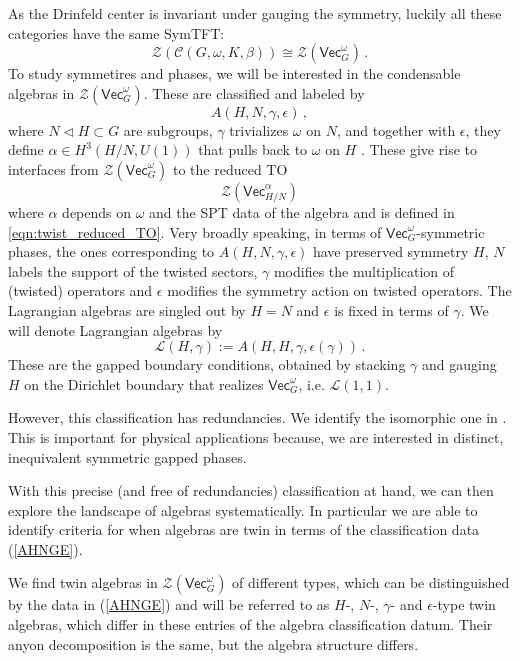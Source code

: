 \documentclass[aps,twocolumn,prx,floatfix,preprintnumbers, nofootinbib,10pt]{revtex4-2}
\numberwithin{equation}{section}
\theoremstyle{definition}
\newcommand{\be}{\begin{equation}}
\newcommand{\ee}{\end{equation}}
\newcommand{\cC}{\mathcal{C}}
\newcommand{\cL}{\mathcal{L}}
\newcommand{\cZ}{\mathcal{Z}}
\renewcommand{\Vec}{\mathsf{Vec}}
\newcommand{\eps}{\epsilon}
\begin{document}
As the Drinfeld center is invariant under gauging the symmetry, luckily all these categories have the same SymTFT: 
\be 
\cZ(\cC(G, \omega, K, \beta))\cong \cZ(\Vec_G^\omega) \,.
\ee
To study symmetires and phases, we will be interested in the condensable algebras in $\cZ(\Vec_G^\omega)$. These are classified and labeled by 
\be \label{AHNGE}
A(H, N, \gamma, \eps) \,,
\ee 
where $N\triangleleft H \subset G$ are subgroups, $\gamma$ trivializes $\omega$ on $N$, and together with $\eps$, they define $\alpha\in H^3(H/N, U(1))$ that pulls back to $\omega$ on $H$ \cite{Davydov2009ModularIF, davydov2017lagrangian, Hannah:2023tae}.
These give rise to interfaces from $\cZ (\Vec_G^\omega)$ to the reduced TO
\be
\label{ReducedTO}
\cZ(\Vec_{H/N}^\alpha)
\ee
where $\alpha$ depends on $\omega$ and the SPT data of the algebra and is defined in \eqref{eqn:twist_reduced_TO}.
Very broadly speaking, in terms of  $\Vec_G^\omega$-symmetric phases, the ones corresponding to $A(H, N, \gamma, \eps)$ have preserved symmetry $H$, $N$ labels the support of the twisted sectors, $\gamma$ modifies the multiplication of (twisted) operators and $\eps$ modifies the symmetry action on twisted operators. The Lagrangian algebras are singled out by $H=N$ and $\epsilon$ is fixed in terms of $\gamma$. We will denote Lagrangian algebras by 
\be
\cL (H, \gamma) := A (H, H, \gamma, \epsilon(\gamma)) \,.
\ee
These are the gapped boundary conditions, obtained by stacking $\gamma$ and gauging $H$ on the Dirichlet boundary that realizes $\Vec_G^\omega$, i.e. $\cL(1,1)$.

However, this classification has redundancies. We identify the isomorphic one in . This is important for physical applications because, we are interested in distinct, inequivalent symmetric gapped phases. 



\vspace{2mm}
With this precise (and free of redundancies) classification at hand, we can then explore the landscape of algebras systematically. In particular we are able to identify criteria for when algebras are twin in terms of the classification data (\ref{AHNGE}).

We find twin algebras in $\cZ(\Vec_G^\omega)$ of different types, which can be distinguished by the data in (\ref{AHNGE}) and will be referred to as $H$-, $N$-, $\gamma$- and $\eps$-type twin algebras, which differ in these entries of the algebra classification datum. Their anyon decomposition is the same, but the algebra structure differs. 
\end{document}
